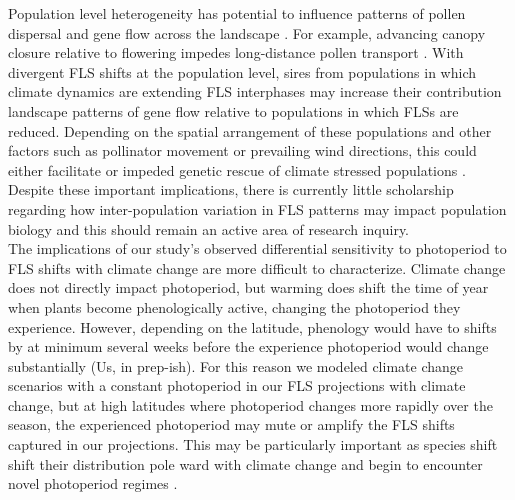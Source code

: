 \documentclass[11pt]{article}
\begin{document}
\noindent Population level heterogeneity has potential to influence patterns of pollen dispersal and gene flow across the landscape \citep{Borycka2017,Pace:2018aa}. For example, advancing canopy closure relative to flowering impedes long-distance pollen transport \citep{Mileron2012}. 
With divergent FLS shifts at the population level, sires from populations in which climate dynamics are extending FLS interphases may increase their contribution landscape patterns of gene flow relative to populations in which FLSs are reduced. Depending on the spatial arrangement of these populations and other factors such as pollinator movement or prevailing wind directions, this could either facilitate or impeded genetic rescue of climate stressed populations \citep{Kling:2020aa}. Despite these important implications, there is currently little scholarship regarding how inter-population variation in FLS patterns may impact population biology and this should remain an active area of research inquiry.\\

\noindent The implications of our study's observed differential sensitivity to photoperiod to FLS shifts with climate change are more difficult to characterize.  Climate change does not directly impact photoperiod, but warming does shift the time of year when plants become phenologically active, changing the photoperiod they experience.  However, depending on the latitude, phenology would have to shifts by at minimum several weeks before the experience photoperiod would change substantially \citep{}(Us, in prep-ish). For this reason we modeled climate change scenarios with a constant photoperiod in our FLS projections with climate change, but at high latitudes where photoperiod changes more rapidly over the season, the experienced photoperiod may mute or amplify the FLS shifts captured in our projections. This may be particularly important as species shift shift their distribution pole ward with climate change and begin to encounter novel photoperiod regimes \citep{WAY:2015aa}.\\ %
\end{document}
